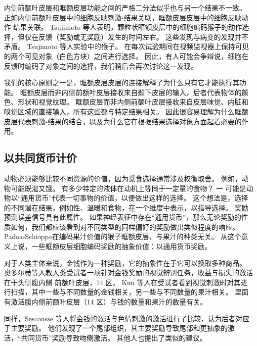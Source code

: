 内侧前额叶皮层和眶额皮层功能之间的严格二分法似乎也与另一个结果不一致。
正如内侧前额叶皮层中的细胞反映刺激-结果关联\cite{kennerley2009evaluating}，眶额皮层皮层中的细胞反映动作-结果关联。
Tsujimoto 等人\cite{tsujimoto2009monkey}表明，颗粒状眶额皮层中的细胞编码猴子的动作选择，但仅在反馈（奖励或无奖励）发生的时间左右。
这些发现与病变的发现并不矛盾。
Tsujimoto 等人实验中的猴子。
在每次试验期间在视频监视器上保持可见的两个可见对象（白色方块）之间进行选择。
因此，有人可能会争辩说，细胞在反馈时编码了对象之间的选择，我们稍后会再次讨论这一发现。\par


我们的核心原则之一是，眶额皮层皮层的连接解释了为什么只有它才能执行其功能。
眶额皮层而非内侧前额叶皮层接收来自颞下皮层的输入，后者代表物体的颜色、形状和视觉纹理。
眶额皮层而非内侧前额叶皮层接收来自皮层味觉、内脏和嗅觉区域的直接输入，所有这些都与特定结果相关。
因此很容易理解为什么眶额皮层代表刺激-结果的结合，以及为什么它在根据结果选择对象方面起着必要的作用。\par



\subsection{以共同货币计价}

动物必须能够比较不同资源的价值，因为觅食选择通常涉及权衡取舍。
例如，动物可能既渴又饿。
有多少特定的液体在动机上等同于一定量的食物？ 一
可能是动物以“通用货币”代表一切事物的价值，以便做出这样的选择。
这个想法是，选择的不同潜在结果，例如性、温暖和食物，在一个维度中表示，以指导选择\cite{montague2002neural}。
奖励预测误差信号具有此属性。
如果神经表征中存在“通用货币”，那么无论奖励的性质如何，我们都应该看到对不同类型的同样偏好的奖励做出类似程度的响应。
Padoa-Schioppa\cite{padoa2006neurons}在编码果汁价值的猴子眶额皮层，与果汁的种类无关。
从这个意义上说，一些眶额皮层细胞编码奖励的抽象价值：以通用货币奖励。\par


对于人类主体来说，金钱作为一种奖励，它的抽象性在于它可以换取多种商品。
奥多尔蒂等人\cite{o2001abstract}教人类受试者一项针对金钱奖励的视觉辨别任务，收益与损失的激活在于头侧腹内侧 前额叶皮层，14 区。
Kim 等人\cite{kim2011overlapping}在受试者看到视觉刺激时对其进行扫描，其中一些与不同数量的金钱相关，另一些与不同数量的果汁相关。
里面有激活腹内侧前额叶皮层（14 区）与钱的数量和果汁的数量有关。\par


同样，Sescousse 等人\cite{sescousse2010architecture}将金钱的激活与色情刺激的激活进行了比较，认为后者对应于主要奖励。
他们发现了一个尾部组织，其主要奖励导致尾部和更抽象的激活，“共同货币”奖励导致吻侧激活。
其他人也提出了类似的建议\cite{kringelbach2004functional}。\par


